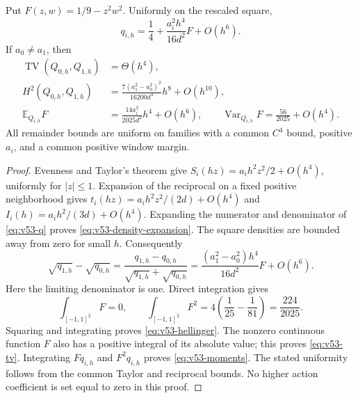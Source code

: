 \begin{lemma}
\label{lem:v53-window-expansion}
Put $F(z,w)=1/9-z^2w^2$.  Uniformly on the rescaled square,
\begin{equation}\label{eq:v53-density-expansion}
 q_{i,h}=\frac14+\frac{a_i^2h^4}{16d^2}F+O(h^6).
\end{equation}
If $a_0\ne a_1$, then
\begin{align}
 \operatorname{TV}(Q_{0,h},Q_{1,h})&=\Theta(h^4),
                                             \label{eq:v53-tv}\\
 H^2(Q_{0,h},Q_{1,h})
  &=\frac{7(a_1^2-a_0^2)^2}{16200d^4}h^8+O(h^{10}),
                                             \label{eq:v53-hellinger}\\
 \mathbb E_{Q_{i,h}}F
  &=\frac{14a_i^2}{2025d^2}h^4+O(h^6),\qquad
 \operatorname{Var}_{Q_{i,h}}F=\frac{56}{2025}+O(h^4).
                                             \label{eq:v53-moments}
\end{align}
All remainder bounds are uniform on families with a common $C^4$ bound,
positive $a_i$, and a common positive window margin.
\end{lemma}

\begin{proof}
Evenness and Taylor's theorem give
$S_i(hz)=a_ih^2z^2/2+O(h^4)$, uniformly for $|z|\le1$.
Expansion of the reciprocal on a fixed positive neighborhood gives
$t_i(hz)=a_ih^2z^2/(2d)+O(h^4)$ and
$I_i(h)=a_ih^2/(3d)+O(h^4)$.  Expanding the numerator and denominator
of \eqref{eq:v53-q} proves \eqref{eq:v53-density-expansion}.
The square densities are bounded away from zero for small $h$.
Consequently
\[
 \sqrt{q_{1,h}}-\sqrt{q_{0,h}}
 =\frac{q_{1,h}-q_{0,h}}{\sqrt{q_{1,h}}+\sqrt{q_{0,h}}}
 =\frac{(a_1^2-a_0^2)h^4}{16d^2}F+O(h^6).
\]
Here the limiting denominator is one.  Direct integration gives
\begin{equation}\label{eq:v53-F-integrals}
 \int_{[-1,1]^2}F=0,\qquad
 \int_{[-1,1]^2}F^2
 =4\left(\frac1{25}-\frac1{81}\right)=\frac{224}{2025}.
\end{equation}
Squaring and integrating proves \eqref{eq:v53-hellinger}.
The nonzero continuous function $F$ also has a positive integral of its
absolute value; this proves \eqref{eq:v53-tv}.  Integrating $Fq_{i,h}$
and $F^2q_{i,h}$ proves \eqref{eq:v53-moments}.  The stated uniformity
follows from the common Taylor and reciprocal bounds.  No higher action
coefficient is set equal to zero in this proof.
\end{proof}

